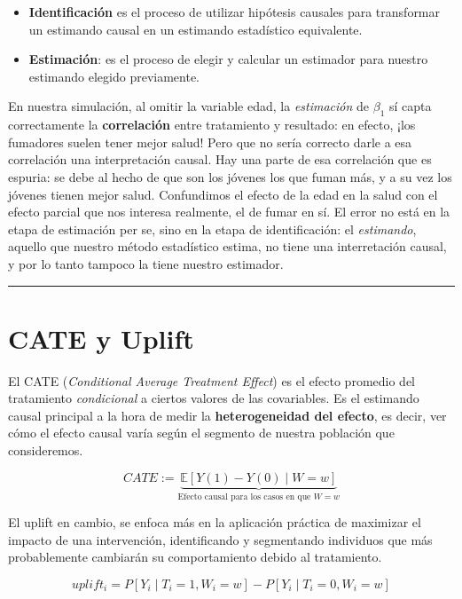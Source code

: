\documentclass[
  a4paper,
  DIV=11,
  numbers=noendperiod]{scrreprt}
\providecommand{\tightlist}{%
  \setlength{\itemsep}{0pt}\setlength{\parskip}{0pt}}\usepackage{longtable,booktabs,array}
\begin{document}
\begin{itemize}
\tightlist
\item
  \textbf{Identificación} es el proceso de utilizar hipótesis causales
  para transformar un estimando causal en un estimando estadístico
  equivalente.
\item
  \textbf{Estimación}: es el proceso de elegir y calcular un estimador
  para nuestro estimando elegido previamente.
\end{itemize}

En nuestra simulación, al omitir la variable edad, la \emph{estimación}
de \(\beta_1\) sí capta correctamente la \textbf{correlación} entre
tratamiento y resultado: en efecto, ¡los fumadores suelen tener mejor
salud! Pero que no sería correcto darle a esa correlación una
interpretación causal. Hay una parte de esa correlación que es espuria:
se debe al hecho de que son los jóvenes los que fuman más, y a su vez
los jóvenes tienen mejor salud. Confundimos el efecto de la edad en la
salud con el efecto parcial que nos interesa realmente, el de fumar en
sí. El error no está en la etapa de estimación per se, sino en la etapa
de identificación: el \emph{estimando}, aquello que nuestro método
estadístico estima, no tiene una interretación causal, y por lo tanto
tampoco la tiene nuestro estimador.

\begin{center}\rule{0.5\linewidth}{0.5pt}\end{center}

\section{CATE y Uplift}\label{cate-y-uplift}

El CATE (\emph{Conditional Average Treatment Effect}) es el efecto
promedio del tratamiento \emph{condicional} a ciertos valores de las
covariables. Es el estimando causal principal a la hora de medir la
\textbf{heterogeneidad del efecto}, es decir, ver cómo el efecto causal
varía según el segmento de nuestra población que consideremos.

\[
CATE := \underbrace{\mathbb{E}[Y(1) - Y(0) \mid W=w]}_{\text{Efecto causal para los casos en que $W=w$}}
\]

El uplift en cambio, se enfoca más en la aplicación práctica de
maximizar el impacto de una intervención, identificando y segmentando
individuos que más probablemente cambiarán su comportamiento debido al
tratamiento.

\[
uplift_i = P[Y_i \mid T_i = 1, W_i = w] - P[Y_i \mid T_i = 0, W_i = w]
\]
\end{document}
